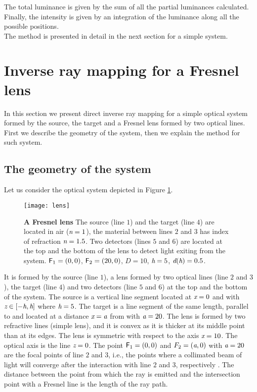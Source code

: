 The total luminance is given by the sum of all the partial luminances calculated.
Finally, the intensity is given by an integration of the luminance along all the possible positions.
\\ \indent
The method is presented in detail in the next section for a simple system.
\section{Inverse ray mapping for a Fresnel lens}
In this section we present direct inverse ray mapping for a simple optical system formed by the source, the target and a Fresnel lens formed by two optical lines.
First we describe the geometry of the system, then we explain the method for such system.
\subsection{The geometry of the system}
Let us consider the optical system depicted in Figure \ref{fig:lens}. 
\begin{figure}[t]
  \begin{center}
  \texttt{[image: lens]}
  \end{center}
  \caption{\textbf{A Fresnel lens}
The source (line $1$) and the target (line $4$) are located in air ($\textit{n} = 1$), the material between lines $2$ and $3$ has index of refraction $\textit{n}=1.5$. 
Two detectors (lines $5$ and $6$) are located at the top and the bottom of the lens to detect light exiting from the system. $\textsf{F}_1 = (0,0)$, $\textsf{F}_2 = (20,0)$, $D=10$, $\textit{h}=5$, $\textit{d}(\textit{h})=0.5$.}
\label{fig:lens}
 \end{figure}
It is formed by the source (line $1$), a lens formed by two optical lines (line $2$ and $3$), the target (line $4$) and two detectors (line $5$ and $6$) at the top and the bottom of the system. The source  is a vertical line segment located at $\textit{x}=0$ and with 
$\textit{z}\in[-\textit{h}, \textit{h}]$ where $\textit{h}=5$. The target  is a line segment of the same length, parallel to  and located at a distance $\textit{x}=\textit{a}$ from  with $\textit{a} = 20$. The lens is formed by two refractive lines (simple lens), and it is convex as it is thicker at its middle point than at its edges.
The lens is symmetric with respect to the axis $\textit{x}=10$. The optical axis is the line $\textit{z}=0$. The point $\textsf{F}_1 = (0,0)$ and $F_2 = (\textit{a}, 0)$ with $\textit{a} = 20$ are the focal points of line $2$ and $3$, i.e., the points where a collimated beam of light will converge after the interaction with line $2$ and $3$, respectively \cite{leutz2012nonimaging}. The distance between the point from which the ray is emitted and the intersection point with a Fresnel line is the length of the ray path.
